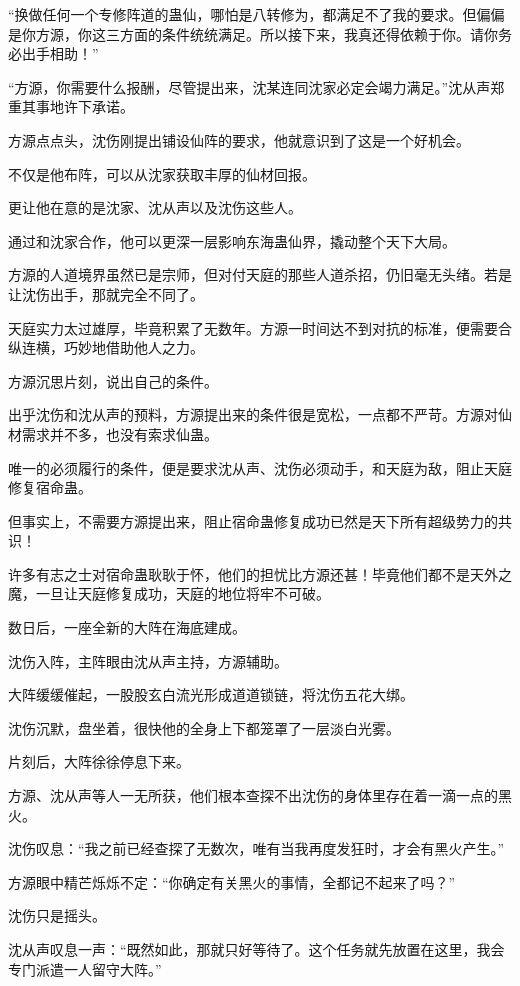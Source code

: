 \begin{this_body}
“换做任何一个专修阵道的蛊仙，哪怕是八转修为，都满足不了我的要求。但偏偏是你方源，你这三方面的条件统统满足。所以接下来，我真还得依赖于你。请你务必出手相助！”

“方源，你需要什么报酬，尽管提出来，沈某连同沈家必定会竭力满足。”沈从声郑重其事地许下承诺。

方源点点头，沈伤刚提出铺设仙阵的要求，他就意识到了这是一个好机会。

不仅是他布阵，可以从沈家获取丰厚的仙材回报。

更让他在意的是沈家、沈从声以及沈伤这些人。

通过和沈家合作，他可以更深一层影响东海蛊仙界，撬动整个天下大局。

方源的人道境界虽然已是宗师，但对付天庭的那些人道杀招，仍旧毫无头绪。若是让沈伤出手，那就完全不同了。

天庭实力太过雄厚，毕竟积累了无数年。方源一时间达不到对抗的标准，便需要合纵连横，巧妙地借助他人之力。

方源沉思片刻，说出自己的条件。

出乎沈伤和沈从声的预料，方源提出来的条件很是宽松，一点都不严苛。方源对仙材需求并不多，也没有索求仙蛊。

唯一的必须履行的条件，便是要求沈从声、沈伤必须动手，和天庭为敌，阻止天庭修复宿命蛊。

但事实上，不需要方源提出来，阻止宿命蛊修复成功已然是天下所有超级势力的共识！

许多有志之士对宿命蛊耿耿于怀，他们的担忧比方源还甚！毕竟他们都不是天外之魔，一旦让天庭修复成功，天庭的地位将牢不可破。

数日后，一座全新的大阵在海底建成。

沈伤入阵，主阵眼由沈从声主持，方源辅助。

大阵缓缓催起，一股股玄白流光形成道道锁链，将沈伤五花大绑。

沈伤沉默，盘坐着，很快他的全身上下都笼罩了一层淡白光雾。

片刻后，大阵徐徐停息下来。

方源、沈从声等人一无所获，他们根本查探不出沈伤的身体里存在着一滴一点的黑火。

沈伤叹息：“我之前已经查探了无数次，唯有当我再度发狂时，才会有黑火产生。”

方源眼中精芒烁烁不定：“你确定有关黑火的事情，全都记不起来了吗？”

沈伤只是摇头。

沈从声叹息一声：“既然如此，那就只好等待了。这个任务就先放置在这里，我会专门派遣一人留守大阵。”


\end{this_body}
